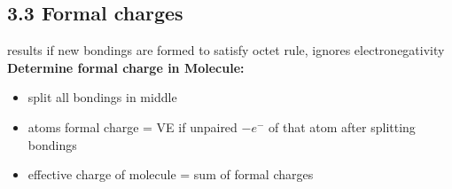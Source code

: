 \subsection{3.3 Formal charges}
    results if new bondings are formed to satisfy octet rule, ignores electronegativity\\
    \textbf{Determine formal charge in Molecule:}
    \begin{itemize}
        \itemsep0em
        \item split all bondings in middle
        \item atoms formal charge = VE if unpaired $- e^-$ of that atom after splitting bondings
        \item effective charge of molecule = sum of formal charges
    \end{itemize}
